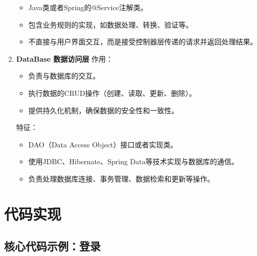 \documentclass{article}
\begin{document}
\begin{enumerate}
\begin{itemize}
        \item Java类或者Spring的@Service注解类。
        \item 包含业务规则的实现，如数据处理、转换、验证等。
        \item 不直接与用户界面交互，而是接受控制器层传递的请求并返回处理结果。
        \end{itemize}
    \item \textbf{DataBase 数据访问层} \newline
    作用：
        \begin{itemize}
        \item 负责与数据库的交互。
        \item 执行数据的CRUD操作（创建、读取、更新、删除）。
        \item 提供持久化机制，确保数据的安全性和一致性。
        \end{itemize}
    特征：
        \begin{itemize}
        \item DAO（Data Access Object）接口或者实现类。
        \item 使用JDBC、Hibernate、Spring Data等技术实现与数据库的通信。
        \item 负责处理数据库连接、事务管理、数据检索和更新等操作。
        \end{itemize}
\end{enumerate}

\section{代码实现}

\subsection{核心代码示例：登录}
\end{document}
